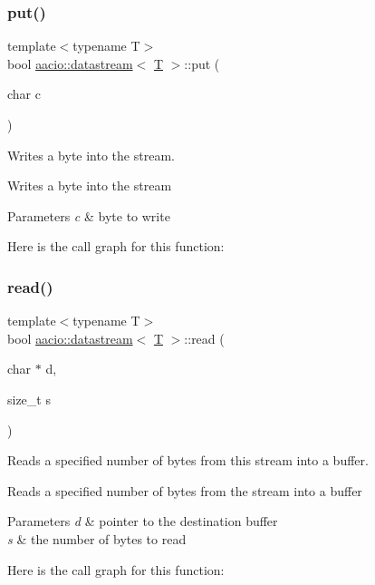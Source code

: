 \subsubsection{\texorpdfstring{put()}{put()}}
{\footnotesize\ttfamily template$<$typename T$>$ \\
bool \mbox{\hyperlink{classaacio_1_1datastream}{aacio\+::datastream}}$<$ \mbox{\hyperlink{struct_t}{T}} $>$\+::put (\begin{DoxyParamCaption}\item[{char}]{c }\end{DoxyParamCaption})\hspace{0.3cm}{\ttfamily [inline]}}



Writes a byte into the stream. 

Writes a byte into the stream 
\begin{DoxyParams}{Parameters}
{\em c} & byte to write \\
\hline
\end{DoxyParams}
Here is the call graph for this function\+:
\mbox{\label{classaacio_1_1datastream_a5dd353d48ab5fd7953182198b4cfb849}} 
\subsubsection{\texorpdfstring{read()}{read()}}
{\footnotesize\ttfamily template$<$typename T$>$ \\
bool \mbox{\hyperlink{classaacio_1_1datastream}{aacio\+::datastream}}$<$ \mbox{\hyperlink{struct_t}{T}} $>$\+::read (\begin{DoxyParamCaption}\item[{char $\ast$}]{d,  }\item[{size\+\_\+t}]{s }\end{DoxyParamCaption})\hspace{0.3cm}{\ttfamily [inline]}}



Reads a specified number of bytes from this stream into a buffer. 

Reads a specified number of bytes from the stream into a buffer 
\begin{DoxyParams}{Parameters}
{\em d} & pointer to the destination buffer \\
\hline
{\em s} & the number of bytes to read \\
\hline
\end{DoxyParams}
Here is the call graph for this function\+:
\mbox{\label{classaacio_1_1datastream_a2d12bc92e24b2621cba916b188428aff}} 
